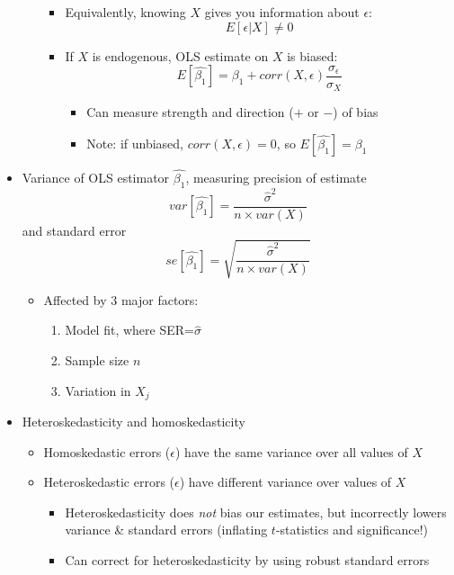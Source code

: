 \documentclass{article}
\begin{document}
\begin{itemize}
\begin{itemize}
		\begin{itemize}
			\item Equivalently, knowing $X$ gives you information about $\epsilon$: 
				\begin{equation*}
 	E[\epsilon|X] \neq 0
 	\end{equation*}
			\item If $X$ is endogenous, OLS estimate on $X$ is biased: 
			\begin{equation*}
E[\hat{\beta_1}]=\beta_1+corr(X,\epsilon)\frac{\sigma_\epsilon}{\sigma_X}
		\end{equation*}
			\begin{itemize}
				\item Can measure strength and direction ($+$ or $-$) of bias 
				\item Note: if unbiased, $corr(X,\epsilon)=0$, so $E[\hat{\beta_1}]=\beta_1$
			\end{itemize}
		\end{itemize}
	\end{itemize}  
	\item Variance of OLS estimator $\hat{\beta_1}$, measuring precision of estimate
			\begin{equation*}
		var[\hat{\beta_1}]=\frac{\hat{\sigma}^2}{n\times var(X)}
		\end{equation*}
		and standard error 
	\begin{equation*}
		se[\hat{\beta_1}]=\sqrt{\frac{\hat{\sigma}^2}{n\times var(X)}}
		\end{equation*}
	\begin{itemize}
	\item Affected by 3 major factors: 
	\begin{enumerate}
		\item Model fit, where SER=$\hat{\sigma}$
		\item Sample size $n$
		\item Variation in $X_j$
	\end{enumerate}
	\end{itemize}
	\item Heteroskedasticity and homoskedasticity
	\begin{itemize}
		\item Homoskedastic errors ($\epsilon$) have the same variance over all values of $X$
		\item Heteroskedastic errors ($\epsilon$) have different variance over values of $X$
		\begin{itemize}
			\item Heteroskedasticity does \emph{not} bias our estimates, but incorrectly lowers variance \& standard errors (inflating $t$-statistics and significance!) 
			\item Can correct for heteroskedasticity by using robust standard errors 
		\end{itemize}
	\end{itemize} 
\end{itemize}
\end{document}
